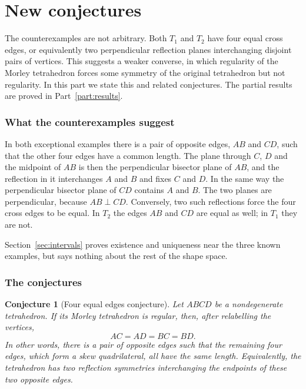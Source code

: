 \documentclass[11pt]{article}
\newtheorem{conjecture}[theorem]{Conjecture}
\theoremstyle{definition}
\theoremstyle{remark}
\begin{document}
\part{New conjectures}
\label{part:conjectures}

The counterexamples are not arbitrary. Both $T_1$ and $T_2$ have four equal cross edges, or equivalently two perpendicular reflection planes interchanging disjoint pairs of vertices. This suggests a weaker converse, in which regularity of the Morley tetrahedron forces some symmetry of the original tetrahedron but not regularity. In this part we state this and related conjectures. The partial results are proved in Part~\ref{part:results}.

\section{What the counterexamples suggest}
\label{sec:suggest}

In both exceptional examples there is a pair of opposite edges, $AB$ and $CD$, such that the other four edges have a common length. The plane through $C$, $D$ and the midpoint of $AB$ is then the perpendicular bisector plane of $AB$, and the reflection in it interchanges $A$ and $B$ and fixes $C$ and $D$. In the same way the perpendicular bisector plane of $CD$ contains $A$ and $B$. The two planes are perpendicular, because $AB\perp CD$. Conversely, two such reflections force the four cross edges to be equal. In $T_2$ the edges $AB$ and $CD$ are equal as well; in $T_1$ they are not.

Section~\ref{sec:intervals} proves existence and uniqueness near the three known examples, but says nothing about the rest of the shape space.

\section{The conjectures}
\label{sec:conjectures}

\begin{conjecture}[Four equal edges conjecture]
\label{conj:four} Let $ABCD$ be a nondegenerate tetrahedron. If its Morley tetrahedron is regular, then, after relabelling the vertices,
\[
AC=AD=BC=BD.
\]
In other words, there is a pair of opposite edges such that the remaining four edges, which form a skew quadrilateral, all have the same length. Equivalently, the tetrahedron has two reflection symmetries interchanging the endpoints of these two opposite edges.
\end{conjecture}
\end{document}
